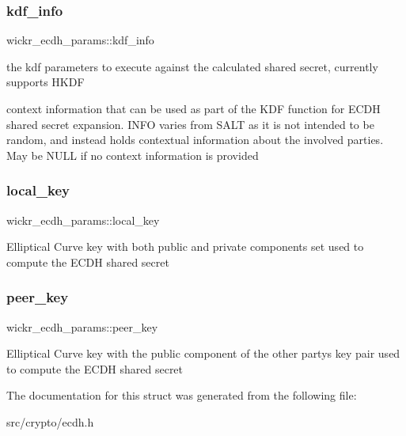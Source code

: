 \subsubsection{\texorpdfstring{kdf\+\_\+info}{kdf\_info}}
{\footnotesize\ttfamily wickr\+\_\+ecdh\+\_\+params\+::kdf\+\_\+info}

the kdf parameters to execute against the calculated shared secret, currently supports H\+K\+DF

context information that can be used as part of the K\+DF function for E\+C\+DH shared secret expansion. I\+N\+FO varies from S\+A\+LT as it is not intended to be random, and instead holds contextual information about the involved parties. May be N\+U\+LL if no context information is provided \mbox{\label{structwickr__ecdh__params_aab5a55e6a516ab8268ef6739ae1422cd}} 
\subsubsection{\texorpdfstring{local\+\_\+key}{local\_key}}
{\footnotesize\ttfamily wickr\+\_\+ecdh\+\_\+params\+::local\+\_\+key}

Elliptical Curve key with both public and private components set used to compute the E\+C\+DH shared secret \mbox{\label{structwickr__ecdh__params_ab17d6191b23fa7fd1befd03b2eee4ba9}} 
\subsubsection{\texorpdfstring{peer\+\_\+key}{peer\_key}}
{\footnotesize\ttfamily wickr\+\_\+ecdh\+\_\+params\+::peer\+\_\+key}

Elliptical Curve key with the public component of the other party\textquotesingle{}s key pair used to compute the E\+C\+DH shared secret 

The documentation for this struct was generated from the following file\+:\begin{DoxyCompactItemize}
\item 
src/crypto/ecdh.\+h\end{DoxyCompactItemize}
